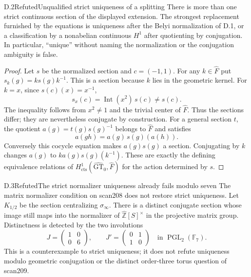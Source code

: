 \begin{claim}{D.2}{Refuted}{Unqualified strict uniqueness of a splitting}
There is more than one strict continuous section of the displayed extension. The strongest replacement furnished by the equations is uniqueness after the Belyi normalization of D.1, or a classification by a nonabelian continuous $H^1$ after quotienting by conjugation. In particular, ``unique'' without naming the normalization or the conjugation ambiguity is false.
\end{claim}

\begin{proof}
Let $s$ be the normalized section and $c=(-1,1)$. For any $k\in\widehat F$ put $s_k(g)=k s(g)k^{-1}$. This is a section because $k$ lies in the geometric kernel. For $k=x$, since $s(c)(x)=x^{-1}$,
\[
 s_x(c)=\operatorname{Int}(x^2)\,s(c)\ne s(c).
\]
The inequality follows from $x^2\ne1$ and the trivial center of $\widehat F$. Thus the sections differ; they are nevertheless conjugate by construction. For a general section $t$, the quotient $a(g)=t(g)s(g)^{-1}$ belongs to $\widehat F$ and satisfies
\[
 a(gh)=a(g)\,s(g)(a(h)).
\]
Conversely this cocycle equation makes $a(g)s(g)$ a section. Conjugating by $k$ changes $a(g)$ to $k a(g)s(g)(k^{-1})$. These are exactly the defining equivalence relations of $H^1_{\mathrm{cts}}(\widehat{\mathrm{GT}}_0,\widehat F)$ for the action determined by $s$.
\end{proof}

\begin{claim}{D.3}{Refuted}{The strict normalizer uniqueness already fails modulo seven}
The matrix normalizer condition on scan208 does not restore strict uniqueness. Let $K_{1/2}$ be the section centralizing $\sigma_\infty$. There is a distinct conjugate section whose image still maps into the normalizer of $\widehat{\mathbb Z}[S]^\times$ in the projective matrix group. Distinctness is detected by the two involutions
\[
 J=\begin{pmatrix}1&0\\0&6\end{pmatrix},\qquad
 J'=\begin{pmatrix}0&1\\1&0\end{pmatrix}
 \quad\text{in }\operatorname{PGL}_2(\mathbb F_7).
\]
This is a counterexample to strict uniqueness; it does not refute uniqueness modulo geometric conjugation or the distinct order-three torus question of scan209.
\end{claim}

